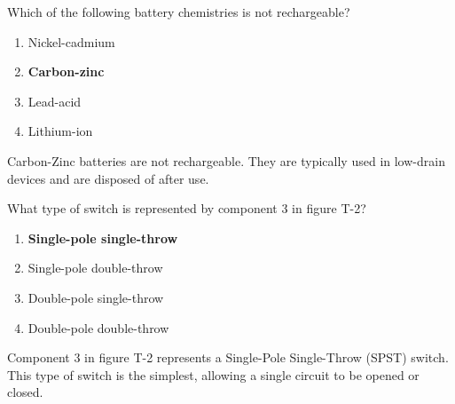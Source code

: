 \begin{tcolorbox}[colback=gray!10!white,colframe=black!75!black,title={T6A11}]
    Which of the following battery chemistries is not rechargeable?
    \begin{enumerate}[label=\Alph*),noitemsep]
        \item Nickel-cadmium
        \item \textbf{Carbon-zinc}
        \item Lead-acid
        \item Lithium-ion
    \end{enumerate}
\end{tcolorbox}
Carbon-Zinc batteries are not rechargeable. They are typically used in low-drain devices and are disposed of after use.

\begin{tcolorbox}[colback=gray!10!white,colframe=black!75!black,title={T6A12}]
    What type of switch is represented by component 3 in figure T-2?
    \begin{enumerate}[label=\Alph*),noitemsep]
        \item \textbf{Single-pole single-throw}
        \item Single-pole double-throw
        \item Double-pole single-throw
        \item Double-pole double-throw
    \end{enumerate}
\end{tcolorbox}
Component 3 in figure T-2 represents a Single-Pole Single-Throw (SPST) switch. This type of switch is the simplest, allowing a single circuit to be opened or closed.
